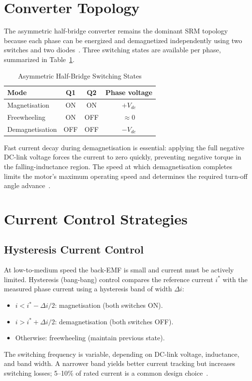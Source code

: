 \documentclass[conference]{IEEEtran}
\begin{document}
\section{Converter Topology}
The asymmetric half-bridge converter remains the dominant SRM topology because each phase can
be energized and demagnetized independently using two switches and two
diodes~\cite{Miller1993}. Three switching states are available per phase, summarized in
Table~\ref{tab:converter}.

\begin{table}[htbp]
\caption{Asymmetric Half-Bridge Switching States}
\label{tab:converter}
\centering
\begin{tabular}{@{}lccc@{}}
\toprule
Mode & Q1 & Q2 & Phase voltage \\
\midrule
Magnetisation  & ON  & ON  & $+V_{dc}$ \\
Freewheeling   & ON  & OFF & $\approx 0$ \\
Demagnetisation & OFF & OFF & $-V_{dc}$ \\
\bottomrule
\end{tabular}
\end{table}

Fast current decay during demagnetisation is essential: applying the full negative DC-link
voltage forces the current to zero quickly, preventing negative torque in the
falling-inductance region. The speed at which demagnetisation completes limits the motor's
maximum operating speed and determines the required turn-off angle advance~\cite{Husain1996}.

\section{Current Control Strategies}
\subsection{Hysteresis Current Control}
At low-to-medium speed the back-EMF is small and current must be actively limited. Hysteresis
(bang-bang) control compares the reference current $i^*$ with the measured phase current using a
hysteresis band of width $\Delta i$:
\begin{itemize}
\item $i < i^* - \Delta i/2$: magnetisation (both switches ON).
\item $i > i^* + \Delta i/2$: demagnetisation (both switches OFF).
\item Otherwise: freewheeling (maintain previous state).
\end{itemize}
The switching frequency is variable, depending on DC-link voltage, inductance, and band width.
A narrower band yields better current tracking but increases switching losses; 5--10\% of rated
current is a common design choice~\cite{Husain1996}.
\end{document}
